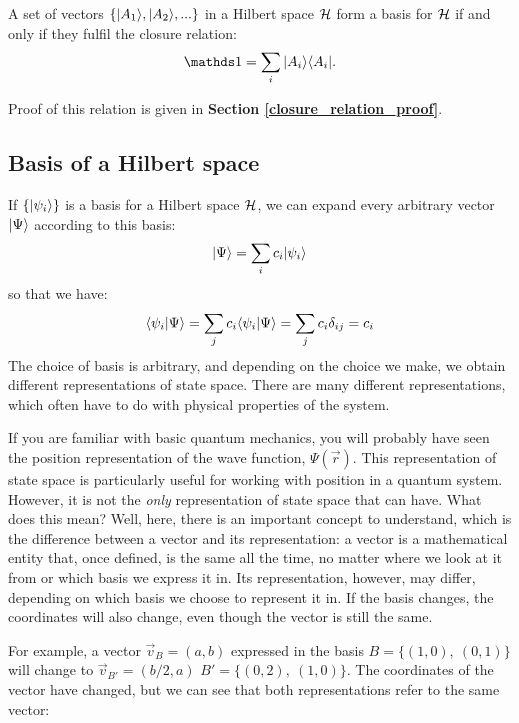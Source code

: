 \begin{definition}
    A set of vectors $\{|A_1\rangle, |A_2\rangle, ...\}$ in a Hilbert space $\mathcal{H}$ form a basis for $\mathcal{H}$ if and only if they fulfil the closure relation:
    \begin{equation}
        \Imat = \sum_i\ket{A_i} \bra{A_i}.
    \end{equation}
\end{definition}

Proof of this relation is given in \textbf{Section \ref{closure_relation_proof}}.

\subsection{Basis of a Hilbert space}

If $\{|\psi_i\rangle\}$ is a basis for a Hilbert space $\mathcal{H}$, we can expand every arbitrary vector $|\Psi\rangle$ according to this basis:
\begin{equation}
    |\Psi\rangle = \sum_i c_i |\psi_i\rangle
\end{equation}
so that we have:
\begin{equation}
    \langle\psi_i|\Psi\rangle = \sum_j c_i \langle\psi_i|\Psi\rangle = \sum_j c_i\delta_{ij} = c_i
\end{equation}
The choice of basis is arbitrary, and depending on the choice we make, we obtain different representations of state space. There are many different representations, which often have to do with physical properties of the system. 

If you are familiar with basic quantum mechanics, you will probably have seen the position representation of the wave function, $\Psi\left(\vec{r}\right)$. This representation of state space is particularly useful for working with position in a quantum system. However, it is not the \textit{only} representation of state space that can have. What does this mean? Well, here, there is an important concept to understand, which is the difference between a vector and its representation: a vector is a mathematical entity that, once defined, is the same all the time, no matter where we look at it from or which basis we express it in. Its representation, however, may differ, depending on which basis we choose to represent it in. If the basis changes, the coordinates will also change, even though the vector is still the same.

For example, a vector $\vec{v}_B = (a, b)$ expressed in the basis $B=\{(1, 0),\ (0, 1)\}$ will change to $\vec{v}_{B'} = (b/2, a)$ $B'=\{(0, 2),\ (1, 0)\}$. The coordinates of the vector have changed, but we can see that both representations refer to the same vector:

